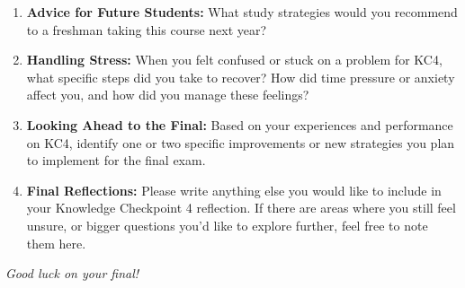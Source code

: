 \documentclass[10pt]{article}
\begin{document}
\begin{enumerate}
\vfill

\item \textbf{Advice for Future Students:}
What study strategies would you recommend to a freshman taking this course next year? 
\vfill

\newpage

\item \textbf{Handling Stress:}
When you felt confused or stuck on a problem for KC4, what specific steps did you take to recover? How did time pressure or anxiety affect you, and how did you manage these feelings? 



\vfill

\item \textbf{Looking Ahead to the Final:}
Based on your experiences and performance on KC4, identify one or two specific improvements or new strategies you plan to implement for the final exam. 

\vfill


\item \textbf{Final Reflections:}
Please write anything else you would like to include in your Knowledge Checkpoint 4 reflection. If there are areas where you still feel unsure, or bigger questions you'd like to explore further, feel free to note them here.

\vfill

\end{enumerate}

\vspace{1em}
\textit{Good luck on your final!}
\end{document}
